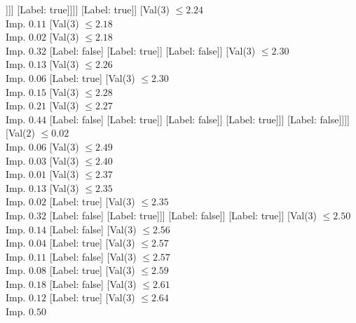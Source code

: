\documentclass[margin=10pt]{standalone}
\begin{document}
\begin{forest}
																		]]]
															[Label: true]]]]
												[Label: true]]
											[Val($3$) $ \leq 2.24$ \\ Imp. $0.11$
												[Val($3$) $ \leq 2.18$ \\ Imp. $0.02$
													[Val($3$) $ \leq 2.18$ \\ Imp. $0.32$
														[Label: false]
														[Label: true]]
													[Label: false]]
												[Val($3$) $ \leq 2.30$ \\ Imp. $0.13$
													[Val($3$) $ \leq 2.26$ \\ Imp. $0.06$
														[Label: true]
														[Val($3$) $ \leq 2.30$ \\ Imp. $0.15$
															[Val($3$) $ \leq 2.28$ \\ Imp. $0.21$
																[Val($3$) $ \leq 2.27$ \\ Imp. $0.44$
																	[Label: false]
																	[Label: true]]
																[Label: false]]
															[Label: true]]]
													[Label: false]]]]
										[Val($2$) $ \leq 0.02$ \\ Imp. $0.06$
											[Val($3$) $ \leq 2.49$ \\ Imp. $0.03$
												[Val($3$) $ \leq 2.40$ \\ Imp. $0.01$
													[Val($3$) $ \leq 2.37$ \\ Imp. $0.13$
														[Val($3$) $ \leq 2.35$ \\ Imp. $0.02$
															[Label: true]
															[Val($3$) $ \leq 2.35$ \\ Imp. $0.32$
																[Label: false]
																[Label: true]]]
														[Label: false]]
													[Label: true]]
												[Val($3$) $ \leq 2.50$ \\ Imp. $0.14$
													[Label: false]
													[Val($3$) $ \leq 2.56$ \\ Imp. $0.04$
														[Label: true]
														[Val($3$) $ \leq 2.57$ \\ Imp. $0.11$
															[Label: false]
															[Val($3$) $ \leq 2.57$ \\ Imp. $0.08$
																[Label: true]
																[Val($3$) $ \leq 2.59$ \\ Imp. $0.18$
																	[Label: false]
																	[Val($3$) $ \leq 2.61$ \\ Imp. $0.12$
																		[Label: true]
																		[Val($3$) $ \leq 2.64$ \\ Imp. $0.50$

\end{forest}
\end{document}

